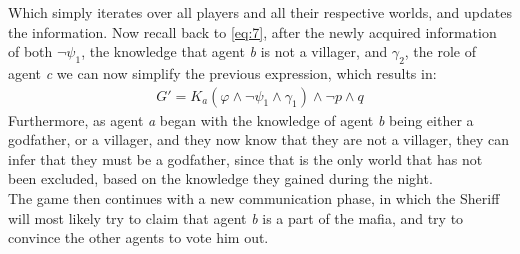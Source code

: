 Which simply iterates over all players and all their respective worlds, and
updates the information. Now recall back to \cref{eq:7}, after the newly
acquired information of both $\neg \psi_1$, the knowledge that agent \textit{b}
is not a villager, and $\gamma_2$, the role of agent \textit{c} we can now
simplify the previous expression, which results in:
\begin{align}
	G' = K_a(\varphi \land \neg \psi_1 \land \gamma_1) \land \neg p \land q
\end{align}
Furthermore, as agent \textit{a} began with the knowledge of agent \textit{b}
being either a godfather, or a villager, and they now know that they are not a
villager, they can infer that they must be a godfather, since that is the only
world that has not been excluded, based on the knowledge they gained during the
night. \\
The game then continues with a new communication phase, in which the Sheriff will 
most likely try to claim that agent \textit{b} is a part of the mafia, and try to 
convince the other agents to vote him out.
